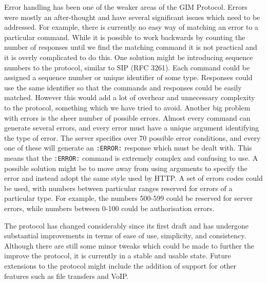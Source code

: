Error handling has been one of the weaker areas of the GIM Protocol. Errors were mostly an after-thought and have several significant issues which need to be addressed. For example, there is currently no easy way of matching an error to a particular command. While it is possible to work backwards by counting the number of responses until we find the matching command it is not practical and it is overly complicated to do this. One solution might be introducing sequence numbers to the protocol, similar to SIP (RFC 3261). Each command could be assigned a sequence number or unique identifier of some type. Responses could use the same identifier so that the commands and responses could be easily matched. However this would add a lot of overhear and unnecessary complexity to the protocol, something which we have tried to avoid. Another big problem with errors is the sheer number of possible errors. Almost every command can generate several errors, and every error must have a unique argument identifying the type of error. The server specifies over 70 possible error conditions, and every one of these will generate an \texttt{:ERROR:} response which must be dealt with. This means that the \texttt{:ERROR:} command is extremely complex and confusing to use. A possible solution might be to move away from using arguments to specify the error and instead adopt the same style used by HTTP. A set of errors codes could be used, with numbers between particular ranges reserved for errors of a particular type. For example, the numbers 500-599 could be reserved for server errors, while numbers between 0-100 could be authorisation errors.

The protocol has changed considerably since its first draft and has undergone substantial improvements in terms of ease of use, simplicity, and consistency. Although there are still some minor tweaks which could be made to further the improve the protocol, it is currently in a stable and usable state. Future extensions to the protocol might include the addition of support for other features such as file transfers and VoIP.
